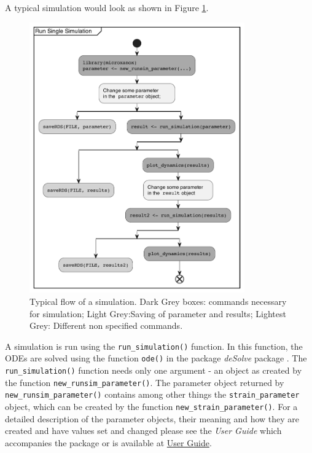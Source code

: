\documentclass[]{elsarticle} %
\begin{document}
A typical simulation would look as shown in Figure
\ref{fig:runsim_example}.

\begin{figure}

{\centering \includegraphics[width=350px]{./figures/simflow} 

}

\caption{Typical flow of a simulation. Dark Grey boxes: commands necessary for simulation; Light Grey:Saving of parameter and results; Lightest Grey: Different non specified commands.}\label{fig:runsim_example}
\end{figure}

A simulation is run using the \texttt{run\_simulation()} function. In
this function, the ODEs are solved using the function \texttt{ode()} in
the package \emph{deSolve} package \citep{Soetaert2010}. The
\texttt{run\_simulation()} function needs only one argument - an object
as created by the function \texttt{new\_runsim\_parameter()}. The
parameter object returned by \texttt{new\_runsim\_parameter()} contains
among other things the \texttt{strain\_parameter} object, which can be
created by the function \texttt{new\_strain\_parameter()}. For a
detailed description of the parameter objects, their meaning and how
they are created and have values set and changed please see the
\emph{User Guide} which accompanies the package or is available at
\href{https://uzh-peg.r-universe.dev/articles/microxanox/User-guide.html}{User
Guide}.
\end{document}
